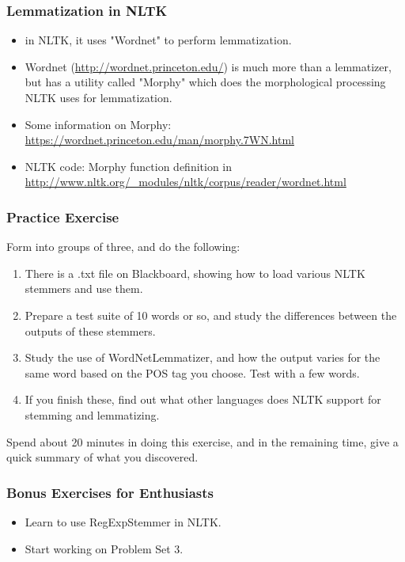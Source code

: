 \documentclass{beamer}
\begin{document}
\begin{frame}
\frametitle{Lemmatization in NLTK}
\begin{itemize}
\item in NLTK, it uses "Wordnet" to perform lemmatization.
\item Wordnet (\url{http://wordnet.princeton.edu/}) is much more than a lemmatizer, but has a utility called "Morphy" which does the morphological processing NLTK uses for lemmatization.
\item Some information on Morphy: \url{https://wordnet.princeton.edu/man/morphy.7WN.html}
\item NLTK code: Morphy function definition in \url{http://www.nltk.org/_modules/nltk/corpus/reader/wordnet.html}
\end{itemize}
\end{frame}

\begin{frame}
\frametitle{Practice Exercise}
Form into groups of three, and do the following:
\begin{enumerate}
\item There is a .txt file on Blackboard, showing how to load various NLTK stemmers and use them.
\item Prepare a test suite of 10 words or so, and study the differences between the outputs of these stemmers. 
\item Study the use of WordNetLemmatizer, and how the output varies for the same word based on the POS tag you choose. Test with a few words.
\item If you finish these, find out what other languages does NLTK support for stemming and lemmatizing.
\end{enumerate}
Spend about 20 minutes in doing this exercise, and in the remaining time, give a quick summary of what you discovered.
\end{frame}

\begin{frame}
\frametitle{Bonus Exercises for Enthusiasts}
\begin{itemize}
\item Learn to use RegExpStemmer in NLTK.
\item Start working on Problem Set 3.
\end{itemize}
\end{frame}
\end{document}
